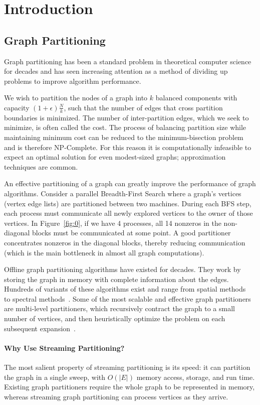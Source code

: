 \section{Introduction}
\subsection{Graph Partitioning}
Graph partitioning has been a standard problem in theoretical computer science for decades and has seen increasing attention as a method of dividing up problems to improve algorithm performance.

We wish to partition the nodes of a graph into $k$ balanced components with capacity $(1+\epsilon)\frac{N}{k}$, such that the number of edges that cross partition boundaries is minimized.
The number of inter-partition edges, which we seek to minimize, is often called the cost.
The process of balancing partition size while maintaining minimum cost can be reduced to the minimum-bisection problem~\cite{Garey:1979:CIG:578533} and is therefore NP-Complete.
For this reason it is computationally infeasible to expect an optimal solution for even modest-sized graphs; approximation techniques are common.

An effective partitioning of a graph can greatly improve the performance of graph algorithms.
Consider a parallel Breadth-First Search where a graph's vertices (vertex edge lists) are partitioned between two machines.
During each BFS step, each process must communicate all newly explored vertices to the owner of those vertices.
In Figure~\ref{fig:0}, if we have 4 processes, all 14 nonzeros in the non-diagonal blocks must be communicated at some point.
A good partitioner concentrates nonzeros in the diagonal blocks, thereby reducing communication (which is the main bottleneck in almost all graph computations).

Offline graph partitioning algorithms have existed for decades.
They work by storing the graph in memory with complete information about the edges.
Hundreds of variants of these algorithms exist and range from spatial methods~\cite{Gilbert95geometricmesh} to spectral methods~\cite{arora2009expander}.
Some of the most scalable and effective graph partitioners are multi-level partitioners, which recursively contract the graph to a small number of vertices, and then heuristically optimize the problem on each subsequent expansion~\cite{karypis1998multilevel}.

\paragraph{Why Use Streaming Partitioning?}
The most salient property of streaming partitioning is its speed: it can partition the graph in a single sweep, with $O(|E|)$ memory access, storage, and run time.
Existing graph partitioners require the whole graph to be represented in memory, whereas streaming graph partitioning can process vertices as they arrive.

